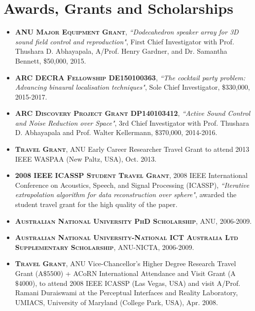 \documentclass[10pt]{article}
\begin{document}
\section*{Awards, Grants and Scholarships}
%
\begin{itemize}
%
\item \textsc{\textbf{ANU Major Equipment Grant}}, \emph{``Dodecahedron speaker array for 3D sound field control and reproduction"}, First Chief Investigator with Prof. Thushara D. Abhayapala, A/Prof. Henry Gardner, and Dr. Samantha Bennett, \$50,000, 2015.

\item \textsc{\textbf{ARC DECRA Fellowship DE150100363}}, \emph{``The cocktail party problem: Advancing binaural localisation techniques"}, Sole Chief Investigator, \$330,000, 2015-2017.

\item \textsc{\textbf{ARC Discovery Project Grant DP140103412}},  \emph{``Active Sound Control and Noise Reduction over Space"}, 3rd Chief Investigator with Prof. Thushara D. Abhayapala and Prof. Walter Kellermann, \$370,000, 2014-2016.

\item \textsc{\textbf{Travel Grant}}, ANU Early Career Researcher Travel Grant to attend 2013 IEEE WASPAA (New Paltz, USA), Oct. 2013.

\item \textsc{\textbf{2008 IEEE ICASSP Student Travel Grant}}, 2008 IEEE International Conference on Acoustics,
Speech, and Signal Processing (ICASSP), \emph{``Iterative extrapolation algorithm for data reconstruction over sphere"}, awarded the student
travel grant for the high quality of the paper.

\item \textsc{\textbf{Australian National University PhD Scholarship}}, ANU, 2006-2009.

\item \textsc{\textbf{Australian National University-National ICT Australia Ltd Supplementary Scholarship}},
ANU-NICTA, 2006-2009.

\item \textsc{\textbf{Travel Grant}}, ANU Vice-Chancellor's Higher Degree Research Travel Grant (A$\$5500$)
+ ACoRN International Attendance and Visit Grant (A$\$4000$), to attend 2008 IEEE ICASSP (Las Vegas, USA) and visit A/Prof. Ramani Duraiswami at
the Perceptual Interfaces and Reality Laboratory, UMIACS, University of Maryland (College Park, USA), Apr. 2008.


\end{itemize}
\end{document}
